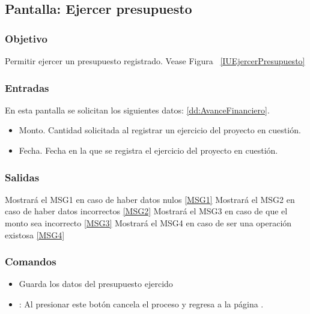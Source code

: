 \subsection{Pantalla: Ejercer presupuesto}

\subsubsection{Objetivo}
Permitir ejercer un presupuesto registrado.  Vease Figura ~\ref{IUEjercerPresupuesto}



\subsubsection{Entradas}
En esta pantalla se solicitan los siguientes datos: \ref{dd:AvanceFinanciero}.
\begin{itemize}
 \item Monto. Cantidad solicitada al registrar un ejercicio del proyecto en cuestión.
 \item Fecha. Fecha en la que se registra el ejercicio del proyecto en cuestión.
\end{itemize}


\subsubsection{Salidas}
Mostrará el MSG1 en caso de haber datos nulos \ref{MSG1}
Mostrará el MSG2 en caso de haber datos incorrectos \ref{MSG2}
Mostrará el MSG3 en caso de que el monto sea incorrecto \ref{MSG3}
Mostrará el MSG4 en caso de ser una operación existosa \ref{MSG4}

\subsubsection{Comandos}
\begin{itemize}
 \item {} Guarda los datos del presupuesto ejercido
 \item {}: Al presionar este botón cancela el proceso y regresa a la página .

\end{itemize}



